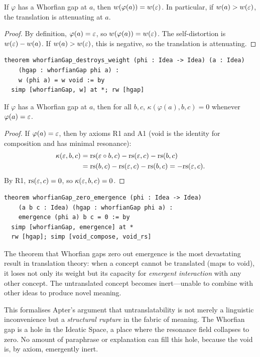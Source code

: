 \begin{theorem}
\label{thm:whorfian-destroys}
If $\varphi$ has a Whorfian gap at $a$, then $w(\varphi(a)) = w(\varepsilon)$.
In particular, if $w(a) > w(\varepsilon)$, the translation is attenuating at $a$.
\end{theorem}

\begin{proof}
By definition, $\varphi(a) = \varepsilon$, so $w(\varphi(a)) = w(\varepsilon)$.
The self-distortion is $w(\varepsilon) - w(a)$.  If $w(a) > w(\varepsilon)$, this is
negative, so the translation is attenuating.
\end{proof}

\begin{lstlisting}
theorem whorfianGap_destroys_weight (phi : Idea -> Idea) (a : Idea)
    (hgap : whorfianGap phi a) :
    w (phi a) = w void := by
  simp [whorfianGap, w] at *; rw [hgap]
\end{lstlisting}

\begin{theorem}
\label{thm:whorfian-zeroes-emergence}
If $\varphi$ has a Whorfian gap at $a$, then for all $b, c$,
$\kappa(\varphi(a), b, c) = 0$ whenever $\varphi(a) = \varepsilon$.
\end{theorem}

\begin{proof}
If $\varphi(a) = \varepsilon$, then by axioms R1 and A1 (void is the identity for
composition and has minimal resonance):
\begin{align*}
  \kappa(\varepsilon, b, c)
    &= \mathrm{rs}(\varepsilon \circ b, c) - \mathrm{rs}(\varepsilon, c) - \mathrm{rs}(b, c) \\
    &= \mathrm{rs}(b, c) - \mathrm{rs}(\varepsilon, c) - \mathrm{rs}(b, c)
     = -\mathrm{rs}(\varepsilon, c).
\end{align*}
By R1, $\mathrm{rs}(\varepsilon, c) = 0$, so $\kappa(\varepsilon, b, c) = 0$.
\end{proof}

\begin{lstlisting}
theorem whorfianGap_zero_emergence (phi : Idea -> Idea)
    (a b c : Idea) (hgap : whorfianGap phi a) :
    emergence (phi a) b c = 0 := by
  simp [whorfianGap, emergence] at *
  rw [hgap]; simp [void_compose, void_rs]
\end{lstlisting}

\begin{interpretation}
\label{int:whorfian-apter}
The theorem that Whorfian gaps zero out emergence is the most devastating
result in translation theory: when a concept cannot be translated (maps to
void), it loses not only its weight but its capacity for \emph{emergent
interaction} with any other concept.  The untranslated concept becomes
inert---unable to combine with other ideas to produce novel meaning.

This formalises Apter's argument that untranslatability is not merely a
linguistic inconvenience but a \emph{structural rupture} in the fabric of
meaning.  The Whorfian gap is a hole in the Ideatic Space, a place where
the resonance field collapses to zero.  No amount of paraphrase or
explanation can fill this hole, because the void is, by axiom, emergently
inert.
\end{interpretation}

